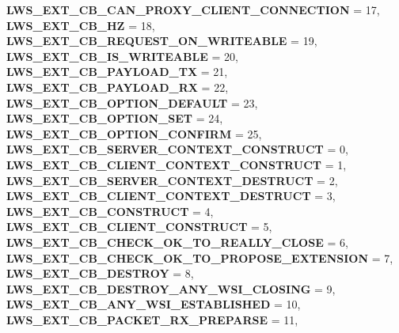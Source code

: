 \begin{DoxyCompactItemize}
{\bfseries L\+W\+S\+\_\+\+E\+X\+T\+\_\+\+C\+B\+\_\+\+C\+A\+N\+\_\+\+P\+R\+O\+X\+Y\+\_\+\+C\+L\+I\+E\+N\+T\+\_\+\+C\+O\+N\+N\+E\+C\+T\+I\+ON} = 17, 
\newline
{\bfseries L\+W\+S\+\_\+\+E\+X\+T\+\_\+\+C\+B\+\_\+HZ} = 18, 
{\bfseries L\+W\+S\+\_\+\+E\+X\+T\+\_\+\+C\+B\+\_\+\+R\+E\+Q\+U\+E\+S\+T\+\_\+\+O\+N\+\_\+\+W\+R\+I\+T\+E\+A\+B\+LE} = 19, 
{\bfseries L\+W\+S\+\_\+\+E\+X\+T\+\_\+\+C\+B\+\_\+\+I\+S\+\_\+\+W\+R\+I\+T\+E\+A\+B\+LE} = 20, 
{\bfseries L\+W\+S\+\_\+\+E\+X\+T\+\_\+\+C\+B\+\_\+\+P\+A\+Y\+L\+O\+A\+D\+\_\+\+TX} = 21, 
\newline
{\bfseries L\+W\+S\+\_\+\+E\+X\+T\+\_\+\+C\+B\+\_\+\+P\+A\+Y\+L\+O\+A\+D\+\_\+\+RX} = 22, 
{\bfseries L\+W\+S\+\_\+\+E\+X\+T\+\_\+\+C\+B\+\_\+\+O\+P\+T\+I\+O\+N\+\_\+\+D\+E\+F\+A\+U\+LT} = 23, 
{\bfseries L\+W\+S\+\_\+\+E\+X\+T\+\_\+\+C\+B\+\_\+\+O\+P\+T\+I\+O\+N\+\_\+\+S\+ET} = 24, 
{\bfseries L\+W\+S\+\_\+\+E\+X\+T\+\_\+\+C\+B\+\_\+\+O\+P\+T\+I\+O\+N\+\_\+\+C\+O\+N\+F\+I\+RM} = 25, 
\newline
{\bfseries L\+W\+S\+\_\+\+E\+X\+T\+\_\+\+C\+B\+\_\+\+S\+E\+R\+V\+E\+R\+\_\+\+C\+O\+N\+T\+E\+X\+T\+\_\+\+C\+O\+N\+S\+T\+R\+U\+CT} = 0, 
{\bfseries L\+W\+S\+\_\+\+E\+X\+T\+\_\+\+C\+B\+\_\+\+C\+L\+I\+E\+N\+T\+\_\+\+C\+O\+N\+T\+E\+X\+T\+\_\+\+C\+O\+N\+S\+T\+R\+U\+CT} = 1, 
{\bfseries L\+W\+S\+\_\+\+E\+X\+T\+\_\+\+C\+B\+\_\+\+S\+E\+R\+V\+E\+R\+\_\+\+C\+O\+N\+T\+E\+X\+T\+\_\+\+D\+E\+S\+T\+R\+U\+CT} = 2, 
{\bfseries L\+W\+S\+\_\+\+E\+X\+T\+\_\+\+C\+B\+\_\+\+C\+L\+I\+E\+N\+T\+\_\+\+C\+O\+N\+T\+E\+X\+T\+\_\+\+D\+E\+S\+T\+R\+U\+CT} = 3, 
\newline
{\bfseries L\+W\+S\+\_\+\+E\+X\+T\+\_\+\+C\+B\+\_\+\+C\+O\+N\+S\+T\+R\+U\+CT} = 4, 
{\bfseries L\+W\+S\+\_\+\+E\+X\+T\+\_\+\+C\+B\+\_\+\+C\+L\+I\+E\+N\+T\+\_\+\+C\+O\+N\+S\+T\+R\+U\+CT} = 5, 
{\bfseries L\+W\+S\+\_\+\+E\+X\+T\+\_\+\+C\+B\+\_\+\+C\+H\+E\+C\+K\+\_\+\+O\+K\+\_\+\+T\+O\+\_\+\+R\+E\+A\+L\+L\+Y\+\_\+\+C\+L\+O\+SE} = 6, 
{\bfseries L\+W\+S\+\_\+\+E\+X\+T\+\_\+\+C\+B\+\_\+\+C\+H\+E\+C\+K\+\_\+\+O\+K\+\_\+\+T\+O\+\_\+\+P\+R\+O\+P\+O\+S\+E\+\_\+\+E\+X\+T\+E\+N\+S\+I\+ON} = 7, 
\newline
{\bfseries L\+W\+S\+\_\+\+E\+X\+T\+\_\+\+C\+B\+\_\+\+D\+E\+S\+T\+R\+OY} = 8, 
{\bfseries L\+W\+S\+\_\+\+E\+X\+T\+\_\+\+C\+B\+\_\+\+D\+E\+S\+T\+R\+O\+Y\+\_\+\+A\+N\+Y\+\_\+\+W\+S\+I\+\_\+\+C\+L\+O\+S\+I\+NG} = 9, 
{\bfseries L\+W\+S\+\_\+\+E\+X\+T\+\_\+\+C\+B\+\_\+\+A\+N\+Y\+\_\+\+W\+S\+I\+\_\+\+E\+S\+T\+A\+B\+L\+I\+S\+H\+ED} = 10, 
{\bfseries L\+W\+S\+\_\+\+E\+X\+T\+\_\+\+C\+B\+\_\+\+P\+A\+C\+K\+E\+T\+\_\+\+R\+X\+\_\+\+P\+R\+E\+P\+A\+R\+SE} = 11, 

\end{DoxyCompactItemize}

